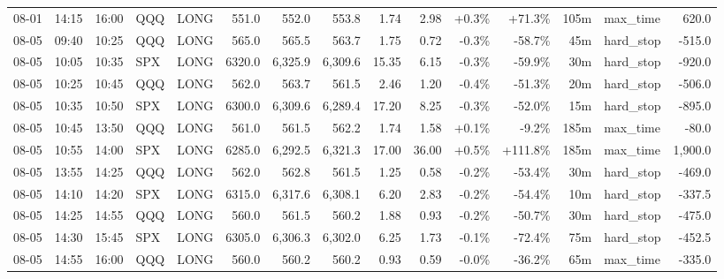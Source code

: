 \documentclass[11pt,a4paper,twoside]{article}
\begin{document}
\begin{landscape}
\begin{center}
\begin{longtable}{>{\color{txtmain}}l l l l l r r r r r r r r >{\color{txtmain}}l r}
08-01 & 14:15 & 16:00 & QQQ & LONG & 551.0 & 552.0 & 553.8 & 1.74 & 2.98 & \textcolor{wingreen}{+0.3\%} & \textcolor{wingreen}{+71.3\%} & 105m & max\_time & \textcolor{wingreen}{620.0} \\
08-05 & 09:40 & 10:25 & QQQ & LONG & 565.0 & 565.5 & 563.7 & 1.75 & 0.72 & \textcolor{lossred}{-0.3\%} & \textcolor{lossred}{-58.7\%} & 45m & hard\_stop & \textcolor{lossred}{-515.0} \\
08-05 & 10:05 & 10:35 & SPX & LONG & 6320.0 & 6,325.9 & 6,309.6 & 15.35 & 6.15 & \textcolor{lossred}{-0.3\%} & \textcolor{lossred}{-59.9\%} & 30m & hard\_stop & \textcolor{lossred}{-920.0} \\
08-05 & 10:25 & 10:45 & QQQ & LONG & 562.0 & 563.7 & 561.5 & 2.46 & 1.20 & \textcolor{lossred}{-0.4\%} & \textcolor{lossred}{-51.3\%} & 20m & hard\_stop & \textcolor{lossred}{-506.0} \\
08-05 & 10:35 & 10:50 & SPX & LONG & 6300.0 & 6,309.6 & 6,289.4 & 17.20 & 8.25 & \textcolor{lossred}{-0.3\%} & \textcolor{lossred}{-52.0\%} & 15m & hard\_stop & \textcolor{lossred}{-895.0} \\
08-05 & 10:45 & 13:50 & QQQ & LONG & 561.0 & 561.5 & 562.2 & 1.74 & 1.58 & \textcolor{wingreen}{+0.1\%} & \textcolor{lossred}{-9.2\%} & 185m & max\_time & \textcolor{lossred}{-80.0} \\
08-05 & 10:55 & 14:00 & SPX & LONG & 6285.0 & 6,292.5 & 6,321.3 & 17.00 & 36.00 & \textcolor{wingreen}{+0.5\%} & \textcolor{wingreen}{+111.8\%} & 185m & max\_time & \textcolor{wingreen}{1,900.0} \\
08-05 & 13:55 & 14:25 & QQQ & LONG & 562.0 & 562.8 & 561.5 & 1.25 & 0.58 & \textcolor{lossred}{-0.2\%} & \textcolor{lossred}{-53.4\%} & 30m & hard\_stop & \textcolor{lossred}{-469.0} \\
08-05 & 14:10 & 14:20 & SPX & LONG & 6315.0 & 6,317.6 & 6,308.1 & 6.20 & 2.83 & \textcolor{lossred}{-0.2\%} & \textcolor{lossred}{-54.4\%} & 10m & hard\_stop & \textcolor{lossred}{-337.5} \\
08-05 & 14:25 & 14:55 & QQQ & LONG & 560.0 & 561.5 & 560.2 & 1.88 & 0.93 & \textcolor{lossred}{-0.2\%} & \textcolor{lossred}{-50.7\%} & 30m & hard\_stop & \textcolor{lossred}{-475.0} \\
08-05 & 14:30 & 15:45 & SPX & LONG & 6305.0 & 6,306.3 & 6,302.0 & 6.25 & 1.73 & \textcolor{lossred}{-0.1\%} & \textcolor{lossred}{-72.4\%} & 75m & hard\_stop & \textcolor{lossred}{-452.5} \\
08-05 & 14:55 & 16:00 & QQQ & LONG & 560.0 & 560.2 & 560.2 & 0.93 & 0.59 & \textcolor{lossred}{-0.0\%} & \textcolor{lossred}{-36.2\%} & 65m & max\_time & \textcolor{lossred}{-335.0} \\

\end{longtable}
\end{center}
\end{landscape}
\end{document}
